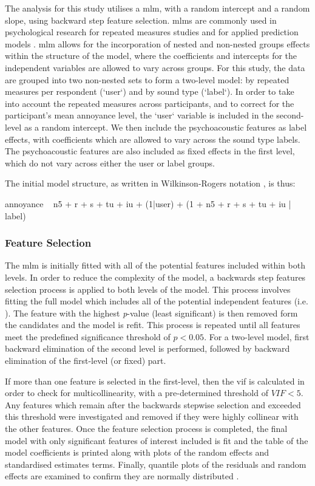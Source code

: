    The analysis for this study utilises a \gls{mlm}, with a random intercept and a random slope, using backward step feature selection. \gls{mlm}s are commonly used in psychological research for repeated measures studies  and for applied prediction models . \gls{mlm} allows for the incorporation of nested and non-nested groups effects within the structure of the model, where the coefficients and intercepts for the independent variables are allowed to vary across groups. For this study, the data are grouped into two non-nested sets to form a two-level model: by repeated measures per respondent (`user`) and by sound type (`label`). In order to take into account the repeated measures across participants, and to correct for the participant's mean annoyance level, the `user` variable is included in the second-level as a random intercept. We then include the psychoacoustic features as label effects, with coefficients which are allowed to vary across the sound type labels. The psychoacoustic features are also included as fixed effects in the first level, which do not vary across either the user or label groups.

   The initial model structure, as written in Wilkinson-Rogers notation , is thus:

   annoyance ~ \gls{n5} + \gls{r} + \gls{s} + \gls{tu} + \gls{iu} + (1|user) + (1 + \gls{n5} + \gls{r} + \gls{s} + \gls{tu} + \gls{iu} | label)

   \subsubsection{Feature Selection}

   The \gls{mlm} is initially fitted with all of the potential features included within both levels. In order to reduce the complexity of the model, a backwards step features selection process is applied to both levels of the model. This process involves fitting the full model which includes all of the potential independent features (i.e. ). The feature with the highest \emph{p}-value (least significant) is then removed form the candidates and the model is refit. This process is repeated until all features meet the predefined significance threshold of $p < 0.05 $. For a two-level model, first backward elimination of the second level is performed, followed by backward elimination of the first-level (or fixed) part.

   If more than one feature is selected in the first-level, then the \gls{vif} is calculated in order to check for multicollinearity, with a pre-determined threshold of $VIF<5$. Any features which remain after the backwards stepwise selection and exceeded this threshold were investigated and removed if they were highly collinear with the other features. Once the feature selection process is completed, the final model with only significant features of interest included is fit and the table of the model coefficients is printed along with plots of the random effects and standardised estimates terms. Finally, quantile plots of the residuals and random effects are examined to confirm they are normally distributed .

